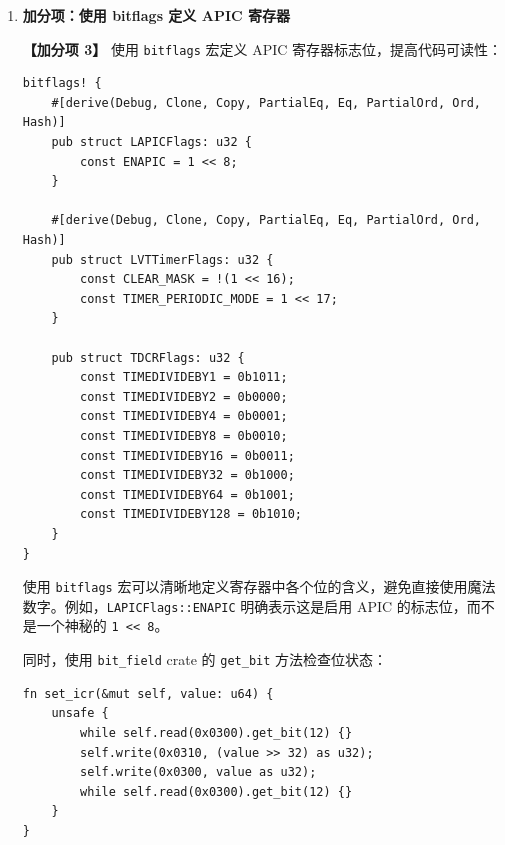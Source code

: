\documentclass{SYSUReport}
\begin{document}
\begin{enumerate}[label={\chinese*、},labelsep=0pt, start=4]
    TDCR（Timer Divide Configuration Register，偏移量 0x3E0）设置分频系数，TICR（Timer Initial Count Register，偏移量 0x380）设置初始计数值。这两个寄存器共同决定了定时器中断的频率。

    禁用 LINT0、LINT1 和 PCINT 是为了防止这些中断线产生意外的中断。这些中断线通常用于连接外部设备，但在本实验中不需要使用。

    清除错误状态寄存器需要连续写入两次 0，这是 APIC 的硬件设计要求。

    发送 INIT De-assert IPI（Inter-Processor Interrupt）是为了同步 APIC 的仲裁 ID。虽然本实验是单核系统，但这个步骤仍然是初始化流程的一部分。

    \item \textbf{加分项：使用 bitflags 定义 APIC 寄存器}

    \textbf{【加分项 3】} 使用 \texttt{bitflags} 宏定义 APIC 寄存器标志位，提高代码可读性：

    \begin{verbatim}
bitflags! {
    #[derive(Debug, Clone, Copy, PartialEq, Eq, PartialOrd, Ord, Hash)]
    pub struct LAPICFlags: u32 {
        const ENAPIC = 1 << 8;
    }

    #[derive(Debug, Clone, Copy, PartialEq, Eq, PartialOrd, Ord, Hash)]
    pub struct LVTTimerFlags: u32 {
        const CLEAR_MASK = !(1 << 16);
        const TIMER_PERIODIC_MODE = 1 << 17;
    }

    pub struct TDCRFlags: u32 {
        const TIMEDIVIDEBY1 = 0b1011;
        const TIMEDIVIDEBY2 = 0b0000;
        const TIMEDIVIDEBY4 = 0b0001;
        const TIMEDIVIDEBY8 = 0b0010;
        const TIMEDIVIDEBY16 = 0b0011;
        const TIMEDIVIDEBY32 = 0b1000;
        const TIMEDIVIDEBY64 = 0b1001;
        const TIMEDIVIDEBY128 = 0b1010;
    }
}
    \end{verbatim}

    使用 \texttt{bitflags} 宏可以清晰地定义寄存器中各个位的含义，避免直接使用魔法数字。例如，\texttt{LAPICFlags::ENAPIC} 明确表示这是启用 APIC 的标志位，而不是一个神秘的 \texttt{1 << 8}。

    同时，使用 \texttt{bit\_field} crate 的 \texttt{get\_bit} 方法检查位状态：

    \begin{verbatim}
fn set_icr(&mut self, value: u64) {
    unsafe {
        while self.read(0x0300).get_bit(12) {}
        self.write(0x0310, (value >> 32) as u32);
        self.write(0x0300, value as u32);
        while self.read(0x0300).get_bit(12) {}
    }
}
    \end{verbatim}


\end{enumerate}
\end{document}
